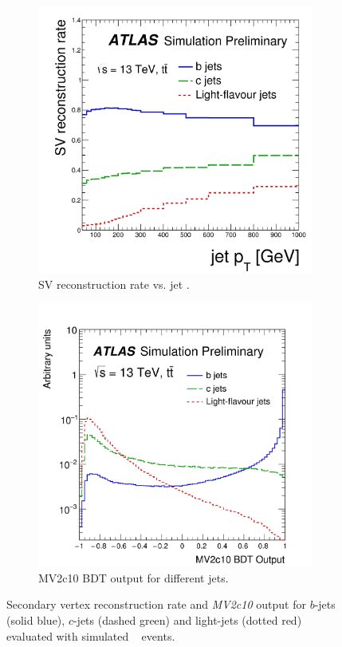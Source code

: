 \begin{figure}[htbp!]
\centering
\captionsetup{justification=centering}
    \begin{subfigure}[b]{0.4\textwidth}
        \includegraphics[width=\textwidth]{figures/object/b_sv}
        \caption{SV reconstruction rate vs. jet \pt.}
        \label{fig:obj_b_sv}
    \end{subfigure}
    \quad
    \begin{subfigure}[b]{0.43\textwidth}
        \includegraphics[width=\textwidth]{figures/object/b_mv2}
        \caption{MV2c10 BDT output for different jets.}
        \label{fig:obj_b_mv2}
    \end{subfigure}
\caption{Secondary vertex reconstruction rate and \emph{MV2c10} output for $b$-jets (solid blue), $c$-jets (dashed green) and light-jets (dotted red) evaluated with simulated \ttbar~ events.}
\label{fig:obj_btag}
\end{figure}

